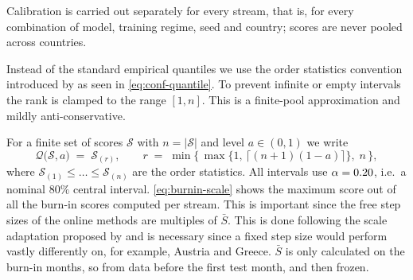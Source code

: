 Calibration is carried out separately for every stream, that is, for every
combination of model, training regime, seed and country; scores are never
pooled across countries.

Instead of the standard empirical quantiles we use the order statistics convention introduced by \textcite{vovk2005algorithmic} as seen in \cref{eq:conf-quantile}. To prevent infinite or empty intervals the rank is clamped to the range $[1,n]$. This is a finite-pool approximation and mildly anti-conservative.


For a finite set of scores $\mathcal{S}$ with $n = |\mathcal{S}|$ and level
$a \in (0,1)$ we write
\begin{equation}
  \mathcal{Q}\big(\mathcal{S}, a\big) \;=\; \mathcal{S}_{(r)},
  \qquad
  r \;=\; \min\!\Big\{\, \max\{1,\, \lceil (n+1)(1-a) \rceil \},\; n \,\Big\},
  \label{eq:conf-quantile}
\end{equation}
where $\mathcal{S}_{(1)} \le \dots \le \mathcal{S}_{(n)}$ are the order
statistics. All intervals use $\alpha = 0.20$, i.e.\ a nominal $80\%$
central interval.
\cref{eq:burnin-scale} shows the maximum score out of all the burn-in scores computed per stream. This is important since the free step sizes of the online methods are multiples of $\bar S$. This is done following the scale adaptation proposed by \textcite{angelopoulos2023pid} and is necessary since a fixed step size would perform vastly differently on, for example, Austria and Greece. $\bar S$ is only calculated on the burn-in months, so from data before the first test month, and then frozen.

